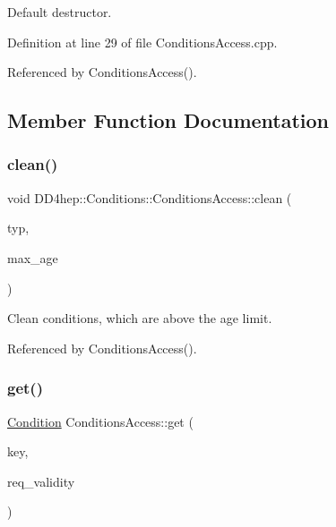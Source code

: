 Default destructor. 



Definition at line 29 of file Conditions\+Access.\+cpp.



Referenced by Conditions\+Access().



\subsection{Member Function Documentation}
\hypertarget{class_d_d4hep_1_1_conditions_1_1_conditions_access_af8320af218167cfc28bf10763cc64f94}{}\label{class_d_d4hep_1_1_conditions_1_1_conditions_access_af8320af218167cfc28bf10763cc64f94} 
\subsubsection{\texorpdfstring{clean()}{clean()}}
{\footnotesize\ttfamily void D\+D4hep\+::\+Conditions\+::\+Conditions\+Access\+::clean (\begin{DoxyParamCaption}\item[{const \hyperlink{class_d_d4hep_1_1_i_o_v_type}{I\+O\+V\+Type} $\ast$}]{typ,  }\item[{int}]{max\+\_\+age }\end{DoxyParamCaption})}



Clean conditions, which are above the age limit. 



Referenced by Conditions\+Access().

\hypertarget{class_d_d4hep_1_1_conditions_1_1_conditions_access_a9adb922d63cdbb66043c5aaf90fe0a20}{}\label{class_d_d4hep_1_1_conditions_1_1_conditions_access_a9adb922d63cdbb66043c5aaf90fe0a20} 
\subsubsection{\texorpdfstring{get()}{get()}\hspace{0.1cm}{\footnotesize\ttfamily [1/2]}}
{\footnotesize\ttfamily \hyperlink{class_d_d4hep_1_1_conditions_1_1_condition}{Condition} Conditions\+Access\+::get (\begin{DoxyParamCaption}\item[{\hyperlink{class_d_d4hep_1_1_conditions_1_1_condition_a7528efa762e8cc072ef80ea67c3531f9}{Condition\+::key\+\_\+type}}]{key,  }\item[{const \hyperlink{class_d_d4hep_1_1_conditions_1_1_condition_ad84300e226b2085ec5e9db7f47be5539}{Condition\+::iov\+\_\+type} \&}]{req\+\_\+validity }\end{DoxyParamCaption})}



